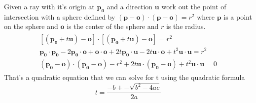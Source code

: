 \documentclass[12pt,pdftex,colorlinks]{report}
\begin{document}
Given a ray with it's origin at $\mathbf{p_0}$ and a direction $\mathbf{u}$ work
out the point of intersection with a sphere defined by
$(\mathbf{p} - \mathbf{o})\cdot(\mathbf{p} - \mathbf{o}) = r^2$ where
$\mathbf{p}$ is a point on the sphere and $\mathbf{o}$ is the center of the
sphere and $r$ is the radius.
\begin{eqnarray}
\begin{split}
	[(\mathbf{p_0} + t\mathbf{u}) - \mathbf{o}] \cdot [(\mathbf{p_0} + t\mathbf{u}) - \mathbf{o}] = r^2 \\
	\mathbf{p_0}\cdot\mathbf{p_0} - 2\mathbf{p_0}\cdot\mathbf{o} + \mathbf{o}
	\cdot \mathbf{o} + 2t\mathbf{p_0} \cdot \mathbf{u} - 2t\mathbf{u} \cdot
	\mathbf{o} + t^2\mathbf{u}\cdot\mathbf{u} = r^2 \\
	(\mathbf{p_0} - \mathbf{o}) \cdot (\mathbf{p_0} - \mathbf{o}) - r^2 +
	2t\mathbf{u} \cdot (\mathbf{p_0} - \mathbf{o}) +
	t^2\mathbf{u}\cdot\mathbf{u} = 0  
\end{split}
\end{eqnarray}
That's a quadratic equation that we can solve for t using the quadratic formula
\[
	t = \frac{-b +- \sqrt{b^2 - 4ac}}{2a}
\]
\end{document}
